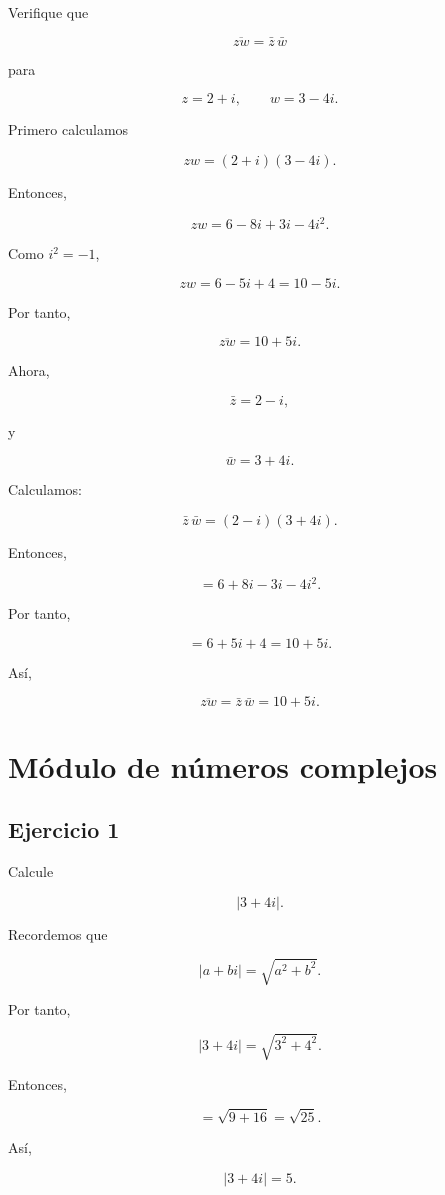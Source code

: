 \documentclass[12pt]{article}
\begin{document}
Verifique que

\[
\overline{zw}=\bar z\,\bar w
\]

para

\[
z=2+i,
\qquad
w=3-4i.
\]

Primero calculamos

\[
zw=(2+i)(3-4i).
\]

Entonces,

\[
zw
=
6-8i+3i-4i^2.
\]

Como \(i^2=-1\),

\[
zw=6-5i+4=10-5i.
\]

Por tanto,

\[
\overline{zw}=10+5i.
\]

Ahora,

\[
\bar z=2-i,
\]

y

\[
\bar w=3+4i.
\]

Calculamos:

\[
\bar z\,\bar w
=
(2-i)(3+4i).
\]

Entonces,

\[
=6+8i-3i-4i^2.
\]

Por tanto,

\[
=6+5i+4
=
10+5i.
\]

Así,

\[
\boxed{
\overline{zw}
=
\bar z\,\bar w
=
10+5i
}.
\]

\section*{Módulo de números complejos}

\subsection*{Ejercicio 1}

Calcule

\[
|3+4i|.
\]

Recordemos que

\[
|a+bi|
=
\sqrt{a^2+b^2}.
\]

Por tanto,

\[
|3+4i|
=
\sqrt{3^2+4^2}.
\]

Entonces,

\[
=\sqrt{9+16}
=
\sqrt{25}.
\]

Así,

\[
\boxed{|3+4i|=5}.
\]
\end{document}
